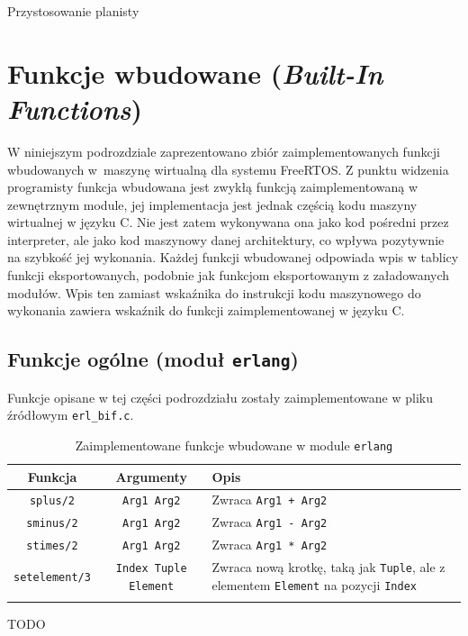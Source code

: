 Przystosowanie planisty 

\section{Funkcje wbudowane (\emph{Built-In Functions})}
\label{sec:maszynaBIF}

W niniejszym podrozdziale zaprezentowano zbiór zaimplementowanych funkcji wbudowanych w~maszynę wirtualną dla systemu FreeRTOS.
Z punktu widzenia programisty funkcja wbudowana jest zwykłą funkcją zaimplementowaną w zewnętrznym module, jej implementacja jest jednak częścią kodu maszyny wirtualnej w języku C.
Nie jest zatem wykonywana ona jako kod pośredni przez interpreter, ale jako kod maszynowy danej architektury, co wpływa pozytywnie na szybkość jej wykonania.
Każdej funkcji wbudowanej odpowiada wpis w tablicy funkcji eksportowanych, podobnie jak funkcjom eksportowanym z załadowanych modułów.
Wpis ten zamiast wskaźnika do instrukcji kodu maszynowego do wykonania zawiera wskaźnik do funkcji zaimplementowanej w języku C.

\subsection{Funkcje ogólne (moduł \texttt{erlang})}
\label{sub:bifErlang}
Funkcje opisane w tej części podrozdziału zostały zaimplementowane w pliku źródłowym \texttt{erl\_bif.c}.

\begin{longtable}{|c|c|p{10cm}|}
\hline

Funkcja & Argumenty & Opis \\
\endfirsthead
\hline
\texttt{splus/2} & \texttt{Arg1 Arg2} & Zwraca \texttt{Arg1 + Arg2} \\
\hline
\texttt{sminus/2} & \texttt{Arg1 Arg2} & Zwraca \texttt{Arg1 - Arg2} \\
\hline
\texttt{stimes/2} & \texttt{Arg1 Arg2} & Zwraca \texttt{Arg1 * Arg2} \\
\hline
\texttt{setelement/3} & \texttt{Index Tuple Element} & Zwraca nową krotkę, taką jak \texttt{Tuple}, ale z elementem \texttt{Element} na pozycji \texttt{Index} \\
\hline
\caption{Zaimplementowane funkcje wbudowane w module \texttt{erlang}} 
\label{table:bifErlang} \\
\end{longtable}

TODO

